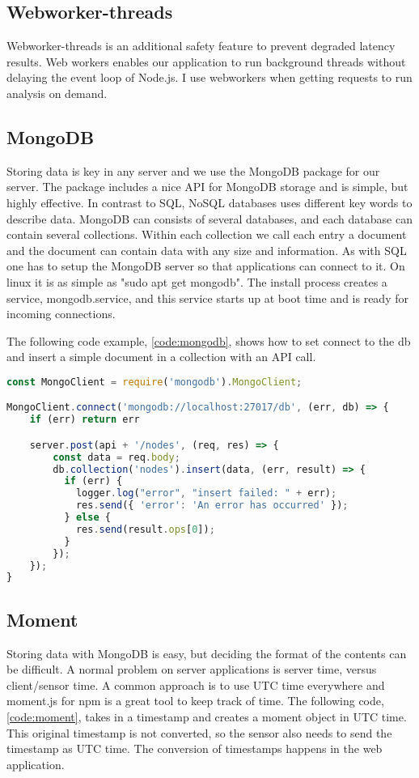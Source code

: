 \documentclass[USenglish]{ifimaster}  %
\begin{document}
\subsection{Webworker-threads}
Webworker-threads is an additional safety feature to prevent degraded latency results. Web workers enables our application to run background threads without delaying the event loop of Node.js. I use webworkers when getting requests to run analysis on demand.

\subsection{MongoDB} \label{subparagraph:mongodb}
Storing data is key in any server and we use the MongoDB package for our server. The package includes a nice API for MongoDB storage and is simple, but highly effective. In contrast to SQL, NoSQL databases uses different key words to describe data. MongoDB can consists of several databases, and each database can contain several collections. Within each collection we call each entry a document and the document can contain data with any size and information. As with SQL one has to setup the MongoDB server so that applications can connect to it. On linux it is as simple as "sudo apt get mongodb". The install process creates a service, mongodb.service, and this service starts up at boot time and is ready for incoming connections.

The following code example, \vref{code:mongodb}, shows how to set connect to the db and insert a simple document in a collection with an API call.

\begin{lstlisting}[caption={MongoDB setup and insertion},label={code:mongodb},language=JavaScript]
const MongoClient = require('mongodb').MongoClient;

MongoClient.connect('mongodb://localhost:27017/db', (err, db) => {
    if (err) return err

    server.post(api + '/nodes', (req, res) => {
        const data = req.body;
        db.collection('nodes').insert(data, (err, result) => {
          if (err) {
            logger.log("error", "insert failed: " + err);
            res.send({ 'error': 'An error has occurred' });
          } else {
            res.send(result.ops[0]);
          }
        });
    });
}
\end{lstlisting}

\subsection{Moment}
Storing data with MongoDB is easy, but deciding the format of the contents can be difficult. A normal problem on server applications is server time, versus client/sensor time. A common approach is to use UTC time everywhere and moment.js for npm is a great tool to keep track of time. The following code, \vref{code:moment}, takes in a timestamp and creates a moment object in UTC time. This original timestamp is not converted, so the sensor also needs to send the timestamp as UTC time. The conversion of timestamps happens in the web application.
\end{document}
